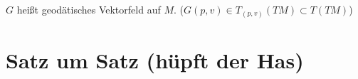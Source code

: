 \documentclass[a4paper,twoside,DIV15,BCOR12mm]{scrbook}
\begin{document}
\begin{definition}
$G$ heißt geodätisches Vektorfeld auf $M$. ($G(p,v) \in T_{(p,v)}(TM) \subset T(TM)$)
\end{definition}

\dieserbefehltexistiertnicht

\appendix

\chapter{Satz um Satz (hüpft der Has)}

\renewcommand{\indexname}{Stichwortverzeichnis}
\addtocounter{chapter}{1}
\printindex
\end{document}
